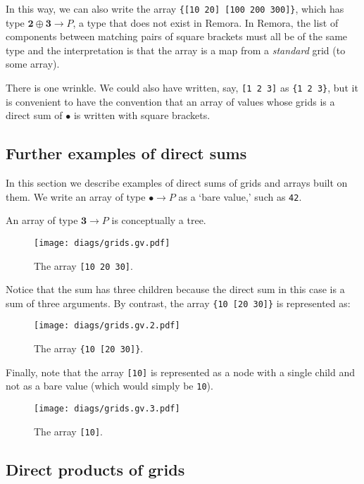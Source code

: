 \documentclass[11pt]{article}
\newcommand{\unit}{\bullet}
\newcommand{\two}{\mathbf{2}}
\newcommand{\three}{\mathbf{3}}
\begin{document}
In this way, we can also write the array \verb|{[10 20] [100 200 300]}|, which
has type $\two\oplus\three \to P$, a type that does not exist in Remora. In Remora, the
list of components between matching pairs of square brackets must all be of the
same type and the interpretation is that the array is a map from a
\emph{standard} grid (to some array).

There is one wrinkle. We could also have written, say, \verb|[1 2 3]| as
\verb|{1 2 3}|, but it is convenient to have the convention that an array of
values whose grids is a direct sum of $\unit$ is written with square brackets. 


\subsection{Further examples of direct sums}

In this section we describe examples of direct sums of grids and arrays built on
them. We write an array of type $\unit\to P$ as a `bare value,' such as
\verb|42|.

An array of type $\three \to P$ is conceptually a tree.
\begin{figure}[h]
  \texttt{[image: diags/grids.gv.pdf]}
  \caption{The array \texttt{[10 20 30]}.}
\end{figure}
Notice that the sum has three children because the direct sum in this case is a sum of
three arguments. By contrast, the array \verb|{10 [20 30]}| is represented as:
\begin{figure}[h]
  \texttt{[image: diags/grids.gv.2.pdf]}
  \caption{The array \texttt{\{10 [20 30]\}}.}
\end{figure}
Finally, note that the array \verb|[10]| is represented as a node with a single
child and not as a bare value (which would simply be \verb|10|).
\begin{figure}[h]
  \texttt{[image: diags/grids.gv.3.pdf]}
  \caption{The array \texttt{[10]}.}
\end{figure}





\subsection{Direct products of grids}
\end{document}
